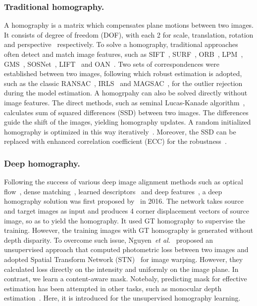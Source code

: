 \documentclass[runningheads]{llncs}
\begin{document}
\subsubsection{Traditional homography.}
A homography is a  matrix which compensates plane motions between two images. It consists of  degree of freedom (DOF), with each 2 for scale, translation, rotation and perspective~\cite{hartley2003multiple} respectively. To solve a homography, traditional approaches often detect and match image features, {\color{black}such as SIFT~\cite{lowe2004distinctive}, SURF~\cite{bay2006surf}, ORB~\cite{rublee2011orb}, LPM~\cite{ma2019locality}, GMS~\cite{bian2017gms}, SOSNet~\cite{tian2019sosnet}, LIFT~\cite{yi2016lift} and OAN~\cite{zhang2019learning}.} Two sets of correspondences were established between two images, following which robust estimation is adopted, such as the classic RANSAC~\cite{fischler1981random}, IRLS~\cite{holland1977robust} and MAGSAC~\cite{barath2019magsac}, for the outlier rejection during the model estimation. A homogrpahy can also be solved directly without image features. The direct methods, such as seminal Lucas-Kanade algorithm~\cite{lucas1981iterative}, calculates sum of squared differences (SSD) between two images. The differences guide the shift of the images, yielding homography updates. A random initialized homography is optimized in this way iteratively~\cite{baker2004lucas}. Moreover, the SSD can be replaced with enhanced correlation coefficient (ECC) for the robustness~\cite{evangelidis2008parametric}.

\subsubsection{Deep homography.}
Following the success of various deep image alignment methods such as optical flow~\cite{weinzaepfel2013deepflow,ilg2017flownet}, dense matching~\cite{revaud2016deepmatching}, learned descriptors~\cite{tian2019sosnet} and deep features~\cite{altwaijry2016learning}, a deep homography solution was first proposed by~\cite{detone2016deep} in 2016. The network takes source and target images as input and produces 4 corner displacement vectors of source image, so as to yield the homography. It used GT homography to supervise the training. However, the training images with GT homography is generated without depth disparity. To overcome such issue, Nguyen~\emph{et al.}~\cite{nguyen2018unsupervised} proposed an unsupervised approach that computed photometric loss between two images and adopted Spatial Transform Network (STN)~\cite{jaderberg2015spatial} for image warping. {\color{black}However, they calculated loss directly on the intensity and uniformly on the image plane. In contrast, we learn a content-aware mask. Notebaly, predicting mask for effective estimation has been attempted in other tasks, such as monocular depth estimation~\cite{zhou2017unsupervised,godard2019digging}. Here, it is introduced for the unsupervised homography learning.}
\end{document}
